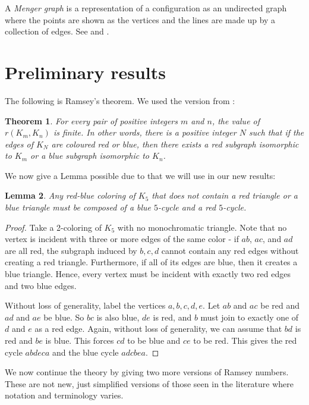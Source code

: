 \documentclass{article}
\newtheorem{thm}{Theorem}[section]
\newtheorem{lem}[thm]{Lemma}
\theoremstyle{definition}
\theoremstyle{remark}
\theoremstyle{definition}
\begin{document}
A \textit{Menger graph} is a representation of a configuration as an undirected graph where the points are shown as the vertices and the lines are made up by a collection of edges. See  \cite{van1947topology} and \cite{coxeter1947configurations}.


\section{Preliminary results}


The following is Ramsey's theorem. We used the version from \cite{do2019party}: 

\begin{thm}
For every pair of positive integers $m$ and $n$, the value of $r(K_m,K_n)$ is finite. In other words, there is a positive integer $N$ such that if the edges of $K_{N}$ are coloured red or blue, then there exists a red subgraph isomorphic to $K_{m}$ or a blue subgraph isomorphic to $K_{n}$.
\end{thm}

We now give a Lemma possible due to \cite{kery} that we will use in our new results:

\begin{lem}
Any red-blue coloring of $K_{5}$ that does not contain a red triangle or a blue triangle must be composed of a blue $5$-cycle and a red $5$-cycle.
\end{lem}
\begin{proof} Take a 2-coloring of $K_5$ with no monochromatic triangle. Note that no vertex is incident with three or more edges of the same color - if $ab$, $ac$, and $ad$ are all red, the subgraph induced by ${b, c, d}$ cannot contain any red edges without creating a red triangle. Furthermore, if all of its edges are blue, then it creates a blue triangle. Hence, every vertex must be incident with exactly two red edges and two blue edges. 

Without loss of generality, label the vertices $a, b, c, d, e$. Let $ab$ and $ac$ be red and $ad$ and $ae$ be blue. So $bc$ is also blue, $de$ is red, and $b$ must join to exactly one of $d$ and $e$ as a red edge.  Again, without loss of generality, we can assume that $bd$ is red and $be$ is blue. This forces $cd$ to be blue and $ce$ to be red.  This gives the red cycle $abdeca$ and the blue cycle $adcbea$. 
\end{proof}




We now continue the theory by giving two more versions of Ramsey numbers. These are not new, just simplified versions of those seen in the literature where notation and terminology varies.
\end{document}
